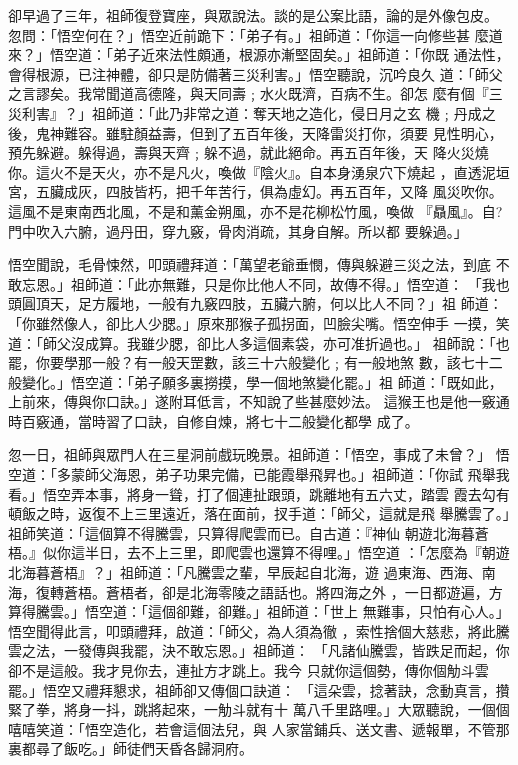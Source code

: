 \begin{pinyinscope}
{卻早過了三年，祖師復登寶座，與眾說法。談的是公案比語，論的是外像包皮。
忽問：「悟空何在？」悟空近前跪下：「弟子有。」祖師道：「你這一向修些甚
麼道來？」悟空道：「弟子近來法性頗通，根源亦漸堅固矣。」祖師道：「你既
通法性，會得根源，已注神體，卻只是防備著三災利害。」悟空聽說，沉吟良久
道：「師父之言謬矣。我常聞道高德隆，與天同壽﹔水火既濟，百病不生。卻怎
麼有個『三災利害』？」祖師道：「此乃非常之道：奪天地之造化，侵日月之玄
機﹔丹成之後，鬼神難容。雖駐顏益壽，但到了五百年後，天降雷災打你，須要
見性明心，預先躲避。躲得過，壽與天齊﹔躲不過，就此絕命。再五百年後，天
降火災燒你。這火不是天火，亦不是凡火，喚做『陰火』。自本身湧泉穴下燒起
，直透泥垣宮，五臟成灰，四肢皆朽，把千年苦行，俱為虛幻。再五百年，又降
風災吹你。這風不是東南西北風，不是和薰金朔風，亦不是花柳松竹風，喚做
『贔風』。自?門中吹入六腑，過丹田，穿九竅，骨肉消疏，其身自解。所以都
要躲過。」

悟空聞說，毛骨悚然，叩頭禮拜道：「萬望老爺垂憫，傳與躲避三災之法，到底
不敢忘恩。」祖師道：「此亦無難，只是你比他人不同，故傳不得。」悟空道：
「我也頭圓頂天，足方履地，一般有九竅四肢，五臟六腑，何以比人不同？」祖
師道：「你雖然像人，卻比人少腮。」原來那猴子孤拐面，凹臉尖嘴。悟空伸手
一摸，笑道：「師父沒成算。我雖少腮，卻比人多這個素袋，亦可准折過也。」
祖師說：「也罷，你要學那一般？有一般天罡數，該三十六般變化﹔有一般地煞
數，該七十二般變化。」悟空道：「弟子願多裏撈摸，學一個地煞變化罷。」祖
師道：「既如此，上前來，傳與你口訣。」遂附耳低言，不知說了些甚麼妙法。
這猴王也是他一竅通時百竅通，當時習了口訣，自修自煉，將七十二般變化都學
成了。

忽一日，祖師與眾門人在三星洞前戲玩晚景。祖師道：「悟空，事成了未曾？」
悟空道：「多蒙師父海恩，弟子功果完備，已能霞舉飛昇也。」祖師道：「你試
飛舉我看。」悟空弄本事，將身一聳，打了個連扯跟頭，跳離地有五六丈，踏雲
霞去勾有頓飯之時，返復不上三里遠近，落在面前，扠手道：「師父，這就是飛
舉騰雲了。」祖師笑道：「這個算不得騰雲，只算得爬雲而已。自古道：『神仙
朝遊北海暮蒼梧。』似你這半日，去不上三里，即爬雲也還算不得哩。」悟空道
：「怎麼為『朝遊北海暮蒼梧』？」祖師道：「凡騰雲之輩，早辰起自北海，遊
過東海、西海、南海，復轉蒼梧。蒼梧者，卻是北海零陵之語話也。將四海之外
，一日都遊遍，方算得騰雲。」悟空道：「這個卻難，卻難。」祖師道：「世上
無難事，只怕有心人。」悟空聞得此言，叩頭禮拜，啟道：「師父，為人須為徹
，索性捨個大慈悲，將此騰雲之法，一發傳與我罷，決不敢忘恩。」祖師道：
「凡諸仙騰雲，皆跌足而起，你卻不是這般。我才見你去，連扯方才跳上。我今
只就你這個勢，傳你個觔斗雲罷。」悟空又禮拜懇求，祖師卻又傳個口訣道：
「這朵雲，捻著訣，念動真言，攢緊了拳，將身一抖，跳將起來，一觔斗就有十
萬八千里路哩。」大眾聽說，一個個嘻嘻笑道：「悟空造化，若會這個法兒，與
人家當鋪兵、送文書、遞報單，不管那裏都尋了飯吃。」師徒們天昏各歸洞府。

}
\end{pinyinscope}
